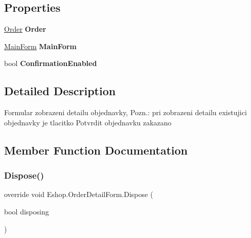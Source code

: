 \subsection*{Properties}
\begin{DoxyCompactItemize}
\item 
\mbox{\label{class_eshop_1_1_order_detail_form_a6754ab7a24c92bb32c1c1b8519bc7e28}} 
\mbox{\hyperlink{class_eshop_1_1_order}{Order}} {\bfseries Order}
\item 
\mbox{\label{class_eshop_1_1_order_detail_form_a9d7485960ec637b4d42b3aea7d018dd4}} 
\mbox{\hyperlink{class_eshop_1_1_main_form}{Main\+Form}} {\bfseries Main\+Form}
\item 
\mbox{\label{class_eshop_1_1_order_detail_form_a04736df5f0184114225d72cf6382b2fc}} 
bool {\bfseries Confirmation\+Enabled}
\end{DoxyCompactItemize}


\subsection{Detailed Description}
Formular zobrazeni detailu objednavky, Pozn.\+: pri zobrazeni detailu existujici objednavky je tlacitko Potvrdit objednavku zakazano 



\subsection{Member Function Documentation}
\mbox{\label{class_eshop_1_1_order_detail_form_a8c1adb79d7320d2f2fe3919c05acbd2a}} 
\subsubsection{\texorpdfstring{Dispose()}{Dispose()}}
{\footnotesize\ttfamily override void Eshop.\+Order\+Detail\+Form.\+Dispose (\begin{DoxyParamCaption}\item[{bool}]{disposing }\end{DoxyParamCaption})\hspace{0.3cm}{\ttfamily [protected]}}



